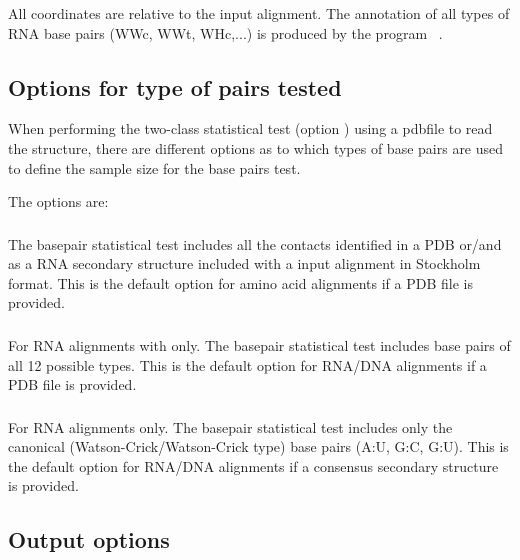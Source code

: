 \noindent
All coordinates are relative to the input alignment. The annotation of
all types of RNA base pairs (WWc, WWt, WHc,...) is produced by the
program ~\citep{YangWesthof03}.

\subsection{Options for type of pairs tested}

When performing the two-class statistical test (option )
using a pdbfile to read the structure, there are different options as
to which types of base pairs are used to define the sample size for the
base pairs test.

The options are:

\subsubsection{}
The basepair statistical test includes all the contacts identified in a PDB
or/and as a RNA secondary structure included with a input alignment in
Stockholm format.  This is the default option for amino acid
alignments if a PDB file is provided.  

\subsubsection{} For RNA alignments with only.
The basepair statistical test includes base pairs of all 12 possible types.
This is the default option for RNA/DNA alignments if a PDB file is
provided.  

\subsubsection{} For RNA alignments only.
The basepair statistical test includes only the canonical
(Watson-Crick/Watson-Crick type) base pairs (A:U, G:C, G:U).  This is
the default option for RNA/DNA alignments if a consensus secondary
structure is provided. 

\subsection{Output options}

\subsubsection{}

